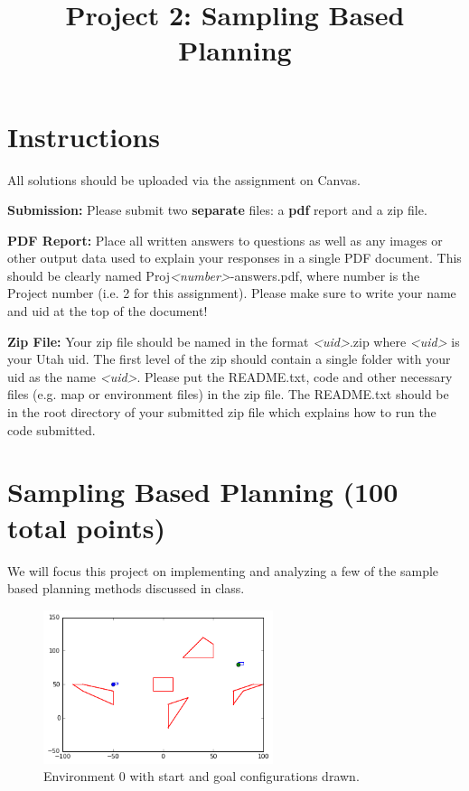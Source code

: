 \documentclass[11pt]{kuntz-hw}
\institute{University of Utah}
\title{Project 2: Sampling Based Planning}
\begin{document}
\maketitle
\vspace{-30pt}
\section*{Instructions}
All solutions should be uploaded via the assignment on Canvas.

\textbf{Submission:} Please submit two \textbf{separate} files: a \textbf{pdf} report and a zip file.

\textbf{PDF Report:} Place all written answers  to questions as well as any images or other output data used to explain your responses in a single PDF document. This should be clearly named Proj\emph{<number>}-answers.pdf, where number is the Project number (i.e. 2 for this assignment). Please make sure to write your name and uid at the top of the document!

\textbf{Zip File:} Your zip file should be named in the format \emph{<uid>}.zip where \emph{<uid>} is your Utah uid. The first level of the zip should contain a single folder with your uid as the name \emph{<uid>}. Please put the README.txt, code and other necessary files (e.g. map or environment files) in the zip file. The README.txt should be in the root directory of your submitted zip file which explains how to run the code submitted.

\section*{Sampling Based Planning (100 total points)}
We will focus this project on implementing and analyzing a few of the sample based planning methods discussed in class.

\begin{figure}[h]
  \centering
  \includegraphics[width=0.6\textwidth]{env0}
  \caption{Environment 0 with start and goal configurations drawn.}
\end{figure}
\end{document}
